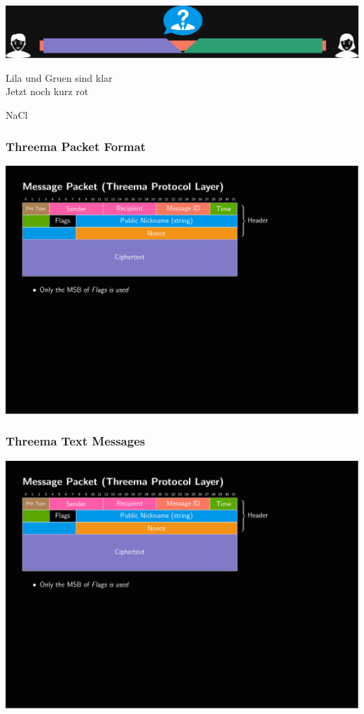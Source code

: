 \documentclass[
	aspectratio=169,
	xetex,
]{beamer}
\begin{document}
\begin{frame}
		\begin{center}\includegraphics[width=\textwidth]{img/2-layer-tunnel.pdf}\end{center}
		Lila und Gruen sind klar\\
		Jetzt noch kurz rot
\end{frame}

\begin{frame}
	NaCl
\end{frame}

\begin{frame}
	\frametitle{Threema Packet Format}

	\includegraphics[page=1,clip,trim={.99cm 8cm 3.2cm 1.8cm},width=\textwidth]{out/messages.pdf}

\end{frame}

\begin{frame}
	\frametitle{Threema Text Messages}
	\includegraphics[page=3,clip,trim={.99cm 7.5cm 3.2cm 1.8cm},width=\textwidth]{out/messages.pdf}
\end{frame}
\end{document}
